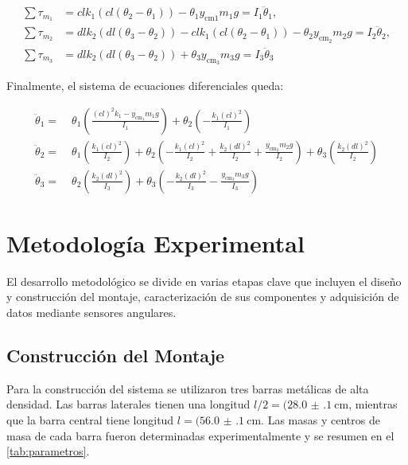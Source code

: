 \begin{align*}
\sum \tau_{m_1} &= cl k_1 (cl(\theta_2 - \theta_1)) - \theta_1 y_{\text{cm}1} m_1 g = I_1 \ddot{\theta}_1, \\
\sum \tau_{m_2} &= dl k_2 (dl(\theta_3 - \theta_2)) - cl k_1 (cl(\theta_2 - \theta_1)) - \theta_2 y_{\text{cm}_2} m_2 g = I_2 \ddot{\theta}_2, \\
\sum \tau_{m_3} &= dl k_2 (dl(\theta_3 - \theta_2)) + \theta_3  y_{\text{cm}_3} m_3 g = I_3 \ddot{\theta}_3
\end{align*}

Finalmente, el sistema de ecuaciones diferenciales queda:

\begin{equation}
\begin{aligned}
\ddot{\theta}_1 =\; & \theta_1 \left( \frac{(cl)^2 k_{1} - y_{\text{cm}_1} m_1 g}{I_1} \right) + \theta_2 \left( -\frac{k_1 (cl)^2}{I_1} \right) \\
\ddot{\theta}_2 =\; & \theta_1 \left( \frac{k_1 (cl)^2}{I_2} \right) + \theta_2 \left( -\frac{k_1 (cl)^2}{I_2} + \frac{k_2 (dl)^2}{I_2} + \frac{y_{\text{cm}_2} m_2 g}{I_2} \right) + \theta_3 \left( \frac{k_2 (dl)^2}{I_2} \right) \\
\ddot{\theta}_3 =\; & \theta_2 \left( \frac{k_2 (dl)^2}{I_3} \right) + \theta_3 \left( -\frac{k_2 (dl)^2}{I_3} - \frac{y_{\text{cm}_3} m_3 g}{I_3} \right)
\end{aligned}
\end{equation}

\section{Metodología Experimental}

El desarrollo metodológico se divide en varias etapas clave que incluyen el diseño y construcción del montaje, caracterización de sus componentes y adquisición de datos mediante sensores angulares.

\subsection*{Construcción del Montaje}

Para la construcción del sistema se utilizaron tres barras metálicas de alta densidad. Las barras laterales tienen una longitud $l/2 = (\qty{28.0(1)}{\centi\metre}$, mientras que la barra central tiene longitud $l = (\qty{56.0(1)}{\centi\metre}$. Las masas y centros de masa de cada barra fueron determinadas experimentalmente y se resumen en el \cref{tab:parametros}.

